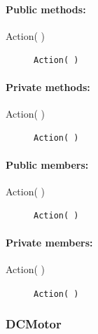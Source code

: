 \paragraph{Public methods:}
\begin{adjustwidth}{2.5em}{0pt}\begin{description}
		\item [Action( )] \texttt{Action( )}
\end{description}\end{adjustwidth}

\paragraph{Private methods:}
\begin{adjustwidth}{2.5em}{0pt}\begin{description}
		\item [Action( )] \texttt{Action( )}
\end{description}\end{adjustwidth}

\paragraph{Public members:}
\begin{adjustwidth}{2.5em}{0pt}\begin{description}
		\item [Action( )] \texttt{Action( )} 
\end{description}\end{adjustwidth}

\paragraph{Private members:}
\begin{adjustwidth}{2.5em}{0pt}\begin{description}
		\item [Action( )] \texttt{Action( )}
\end{description}\end{adjustwidth}

\subsubsection{DCMotor}

